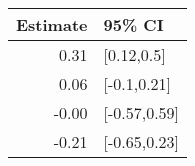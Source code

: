 \begin{tabular}{rl}
  \hline
Estimate & 95\% CI \\ 
  \hline
0.31 & [0.12,0.5] \\ 
  0.06 & [-0.1,0.21] \\ 
  -0.00 & [-0.57,0.59] \\ 
  -0.21 & [-0.65,0.23] \\ 
   \hline
\end{tabular}

